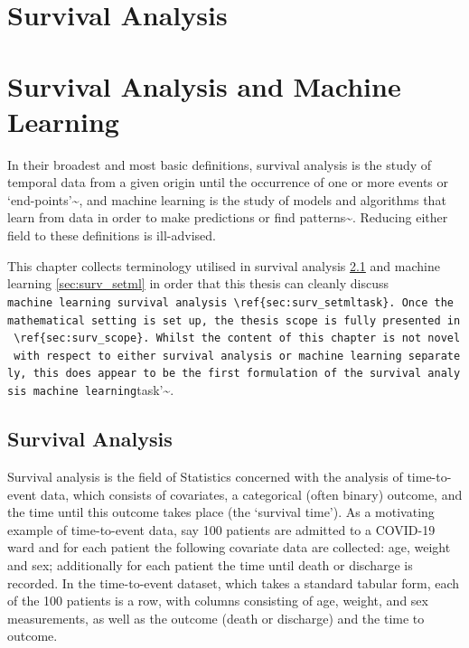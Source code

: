 \documentclass[
  letterpaper,
]{scrbook}
\theoremstyle{plain}
\theoremstyle{definition}
\theoremstyle{remark}
\begin{document}

\hypertarget{survival-analysis}{%
\chapter{Survival Analysis}\label{survival-analysis}}

\chapter[Survival Analysis and Machine Learning]{Survival Analysis and Machine\\Learning}
\label{chap:surv}

In their broadest and most basic definitions, survival analysis is the
study of temporal data from a given origin until the occurrence of one
or more events or `end-points'\textasciitilde{}\cite{Collett2014}, and
machine learning is the study of models and algorithms that learn from
data in order to make predictions or find
patterns\textasciitilde{}\cite{Hastie2001}. Reducing either field to
these definitions is ill-advised.

This chapter collects terminology utilised in survival analysis
\ref{sec:surv_set} and machine learning \ref{sec:surv_setml} in order
that this thesis can cleanly discuss
\texttt{machine\ learning\ survival\ analysis\textquotesingle{}\ \textbackslash{}ref\{sec:surv\_setmltask\}.\ Once\ the\ mathematical\ setting\ is\ set\ up,\ the\ thesis\ scope\ is\ fully\ presented\ in\ \textbackslash{}ref\{sec:surv\_scope\}.\ Whilst\ the\ content\ of\ this\ chapter\ is\ not\ novel\ with\ respect\ to\ either\ survival\ analysis\ or\ machine\ learning\ separately,\ this\ does\ appear\ to\ be\ the\ first\ formulation\ of\ the\ survival\ analysis\ machine\ learning}task'\textasciitilde{}\cite{Kiraly2021}.

\section{Survival Analysis}
\label{sec:surv_set}

Survival analysis is the field of Statistics concerned with the analysis
of time-to-event data, which consists of covariates, a categorical
(often binary) outcome, and the time until this outcome takes place (the
`survival time'). As a motivating example of time-to-event data, say 100
patients are admitted to a COVID-19 ward and for each patient the
following covariate data are collected: age, weight and sex;
additionally for each patient the time until death or discharge is
recorded. In the time-to-event dataset, which takes a standard tabular
form, each of the 100 patients is a row, with columns consisting of age,
weight, and sex measurements, as well as the outcome (death or
discharge) and the time to outcome.
\end{document}
